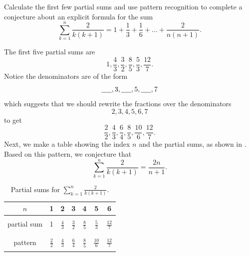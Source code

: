 \begin{exam}
\label{exam_sum_recip_hs_conj}
    Calculate the first few partial sums and use pattern recognition to complete a conjecture about an explicit formula for the sum
        $$\displaystyle \sum_{k=1}^n\frac{2}{k(k+1)}= 1 + \frac{1}{3} + \frac{1}{6} + \ldots+\frac{2}{n(n+1)}.$$
            \begin{soln}  
                The first five partial sums are 
                    $$1, \frac{4}{3}, \frac{3}{2}, \frac{8}{5}, \frac{5}{3}, \frac{12}{7}.$$
                Notice the denominators are of the form     
                    $$\underline{\hspace{.2in}}, 3, \underline{\hspace{.2in}}, 5, \underline{\hspace{.2in}}, 7$$
                which suggests that we should rewrite the fractions over the denominators
                $$2, 3, 4, 5, 6, 7$$
                to get
                    $$\frac{2}{2}, \frac{4}{3}, \frac{6}{4}, \frac{8}{5}, \frac{10}{6}, \frac{12}{7}.$$      
                Next, we make a table showing the index $n$ and the partial sums, as shown in .
                Based on this pattern, we conjecture that $$\sum_{k=1}^n\frac{2}{k(k+1)}= \frac{2n}{n+1}.$$
                \end{soln}                    
  
                \begin{table}[hbtp]
                    \centering
                    \begin{tabular}{c|c|c|c|c|c|c}
                        $n$ & 1 & 2 & 3 & 4 & 5 & 6  \\ \hline
                        &&&&&& \\
                        partial sum  & 1 & $\displaystyle \frac{4}{3}$ & $\displaystyle\frac{3}{2}$  & $\displaystyle\frac{8}{5}$ & $\displaystyle\frac{5}{3}$ & $\displaystyle\frac{12}{7}$ \\
                        &&&&&& \\ \hline 
                        &&&&&& \\
                        pattern & $\displaystyle\frac{2}{2}$ & $\displaystyle\frac{4}{3}$ & $\displaystyle\frac{6}{4}$  & $\displaystyle\frac{8}{5}$ & $\displaystyle\frac{10}{6}$ & $\displaystyle\frac{12}{7}$ \\ 
                        &&&&&& 
                    \end{tabular}
                    \caption{Partial sums for $\displaystyle \sum_{k=1}^n\frac{2}{k(k+1)}$.}
                    \label{tab_partial_sums_recip_hs}
                \end{table}
    
\end{exam}

